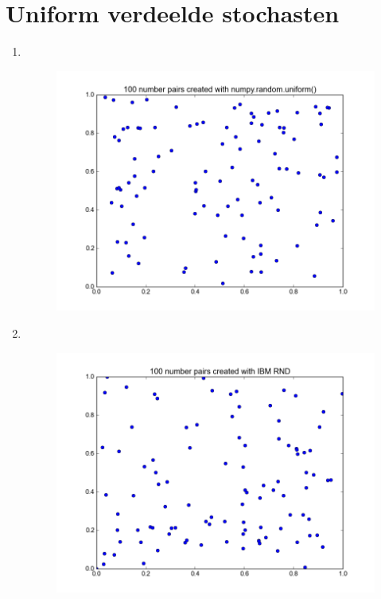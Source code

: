\documentclass[a4paper,12px]{article}
\begin{document}
\section{Uniform verdeelde stochasten}
\begin{enumerate}
    \item $ $
        \begin{figure}[!h]
            \centering
            \includegraphics[width=\textwidth]{uniform.png}
        \end{figure}
        \FloatBarrier
    \item $ $
        \begin{figure}[!h]
            \centering
            \includegraphics[width=\textwidth]{ibm.png}

\end{figure}
\end{enumerate}
\end{document}

